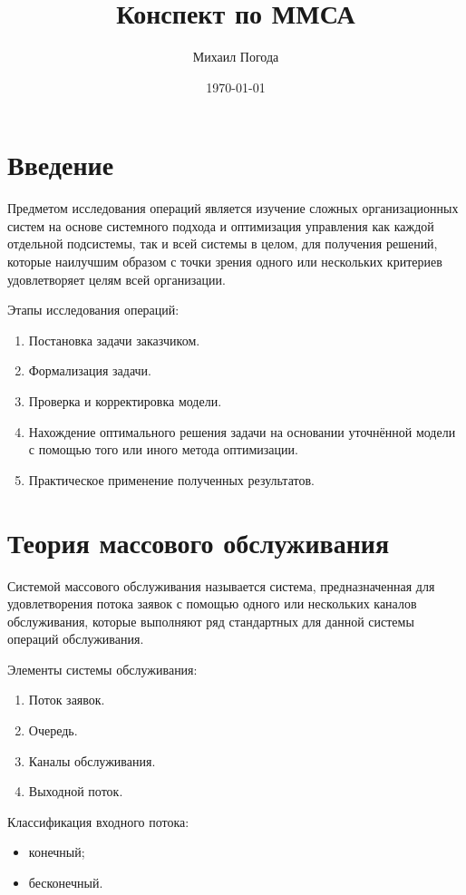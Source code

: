 \documentclass[a4paper,12pt,notitlepage,pdftex,headsepline]{scrartcl}
\author{Михаил Погода}
\title{Конспект по ММСА}
\date{\today}
\begin{document}
\begin{titlepage}
  \maketitle
\end{titlepage}

\tableofcontents
\newpage

\section{Введение}
  Предметом исследования операций является изучение сложных организационных
  систем на основе системного подхода и оптимизация управления как каждой
  отдельной подсистемы, так и всей системы в целом, для получения решений,
  которые наилучшим образом с точки зрения одного или нескольких критериев
  удовлетворяет целям всей организации.

  Этапы исследования операций:
  \begin{enumerate}
    \item Постановка задачи заказчиком.
    \item Формализация задачи.
    \item Проверка и корректировка модели.
    \item Нахождение оптимального решения задачи на основании уточнённой модели
      с помощью того или иного метода оптимизации.
    \item Практическое применение полученных результатов.
  \end{enumerate}
\section{Теория массового обслуживания}
  Системой массового обслуживания называется система, предназначенная для
  удовлетворения потока заявок с помощью одного или нескольких каналов
  обслуживания, которые выполняют ряд стандартных для данной системы операций
  обслуживания.

  Элементы системы обслуживания:
  \begin{enumerate}
    \item Поток заявок.
    \item Очередь.
    \item Каналы обслуживания.
    \item Выходной поток.
  \end{enumerate}

  Классификация входного потока:
  \begin{itemize}
    \item конечный;
    \item бесконечный.
  \end{itemize}
\end{document}
